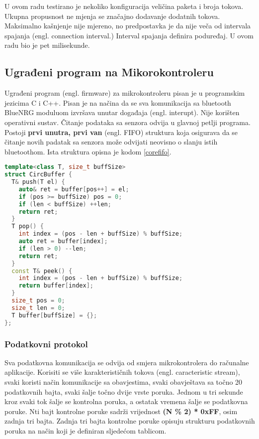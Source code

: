 \documentclass[times, utf8, diplomski]{diplomski}
\begin{document}
U ovom radu testirano je nekoliko konfiguracija veličina paketa i broja tokova. Ukupna propusnost ne mjenja se značajno dodavanje dodatnih tokova. Maksimalno kašnjenje nije mjereno, no predpostavka je da nije veča od intervala spajanja (engl. connection interval.) Interval spajanja definira poduređaj. U ovom radu bio je pet milisekunde.


\subsection{Ugrađeni program na Mikorokontroleru}
Ugrađeni program (engl. firmware) za mikrokontroleru pisan je u programskim jezicima C i C++. Pisan je na načina da se sva komunikacija sa bluetooth BlueNRG moduluom izvršava unutar događaja (engl. interupt). Nije korišten operativni sustav. Čitanje podataka sa senzora odvija u glavnoj petlji programa. Postoji \textbf{prvi unutra, prvi van} (engl. FIFO) struktura koja osigurava da se čitanje novih padatak sa senzora može odvijati neovisno o slanju istih bluetoothom. Ista struktura opisna je kodom \ref{corefifo}.

\begin{lstlisting}[language=c++, caption={FIFO struktura koja omgučuje neovisan dohvat novih podataka i slanje najstarijih}, label={codefifo}]
template<class T, size_t buffSize>
struct CircBuffer {
  T& push(T el) {
    auto& ret = buffer[pos++] = el;
    if (pos >= buffSize) pos = 0;
    if (len < buffSize) ++len;
    return ret;
  }
  T pop() {
    int index = (pos - len + buffSize) % buffSize;
    auto ret = buffer[index];
    if (len > 0) --len;
    return ret;
  }
  const T& peek() {
    int index = (pos - len + buffSize) % buffSize;
    return buffer[index];
  }
  size_t pos = 0;
  size_t len = 0;
  T buffer[buffSize] = {};
};
\end{lstlisting}

\subsubsection{Podatkovni protokol}
Sva podatkovna komunikacija se odvija od smjera mikrokontrolera do računalne aplikacije. Korisiti se više karakterističnih tokova (engl. caracteristic stream), svaki koristi način komunikacije sa obavjestima, svaki obavještava sa točno 20 podatkovnih bajta, svaki šalje točno dvije vrste poruka. Jednom u tri sekunde kroz svaki tok šalje se kontrolna poruka, a ostatak vremena šalje se podatkovna poruke. Nti bajt kontrolne poruke sadrži vrijednost \textbf{(N \% 2) * 0xFF}, osim zadnja tri bajta. Zadnja tri bajta kontrolne poruke opisuju strukturu podatkovnih poruka na način koji je definiran sljedećom tablicom.
\newpage{}
\end{document}
